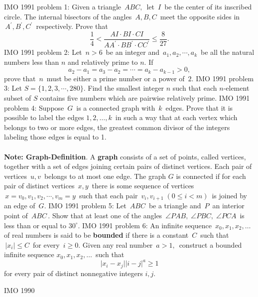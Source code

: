 IMO 1991 problem 1:  Given a triangle $ \,ABC,\,$ let $ \,I\,$ be the center of its inscribed circle. The internal bisectors of the angles $ \,A,B,C\,$ meet the opposite sides in $ \,A^{\prime },B^{\prime },C^{\prime }\,$ respectively. Prove that
\[
\frac {1}{4} < \frac {AI\cdot BI\cdot CI}{AA^{\prime }\cdot BB^{\prime }\cdot CC^{\prime }} \leq \frac {8}{27}.
\] 
IMO 1991 problem 2:  Let $ \,n > 6\,$ be an integer and $ \,a_1,a_2,\cdots ,a_k\,$  be all the natural numbers less than $ n$ and relatively prime to $ n$. If
\[ a_2 - a_1 = a_3 - a_2 = \cdots = a_k - a_{k - 1} > 0, \]
prove that $ \,n\,$ must be either a prime number or a power of $ \,2$. 
IMO 1991 problem 3:  Let $ S = \{1,2,3,\cdots ,280\}$. Find the smallest integer $ n$ such that each $ n$-element subset of $ S$ contains five numbers which are pairwise relatively prime. 
IMO 1991 problem 4:  Suppose $ \,G\,$ is a connected graph with $ \,k\,$ edges. Prove that it is possible to label the edges $ 1,2,\ldots ,k\,$ in such a way that at each vertex which belongs to two or more edges, the greatest common divisor of the integers labeling those edges is equal to 1. \\\\
\textbf{Note: Graph-Definition}. A \textbf{graph} consists of a set of points, called vertices, together with a set of edges joining certain pairs of distinct vertices. Each pair of vertices $ \,u,v\,$ belongs to at most one edge. The graph $ G$ is connected if for each pair of distinct vertices $ \,x,y\,$ there is some sequence of vertices $ \,x = v_0,v_1,v_2,\cdots ,v_m = y\,$ such that each pair $ \,v_i,v_{i + 1}\;(0\leq i < m)\,$ is joined by an edge of $ \,G$. 
IMO 1991 problem 5:  Let $ \,ABC\,$ be a triangle and $ \,P\,$ an interior point of  $ \,ABC\,$. Show that at least one of the angles $ \,\angle PAB,\;\angle PBC,\;\angle PCA\,$ is less than or equal to $ 30^{\circ }$. 
IMO 1991 problem 6:  An infinite sequence $ \,x_0,x_1,x_2,\ldots \,$ of real numbers is said to be \textbf{bounded} if there is a constant $ \,C\,$ such that $ \, \vert x_i \vert \leq C\,$ for every $ \,i\geq 0$. Given any real number $ \,a > 1,\,$ construct a bounded infinite sequence $ x_0,x_1,x_2,\ldots \,$ such that
\[ \vert x_i - x_j \vert \vert i - j \vert^a\geq 1 \]
for every pair of distinct nonnegative integers $ i, j$. 

IMO 1990 

